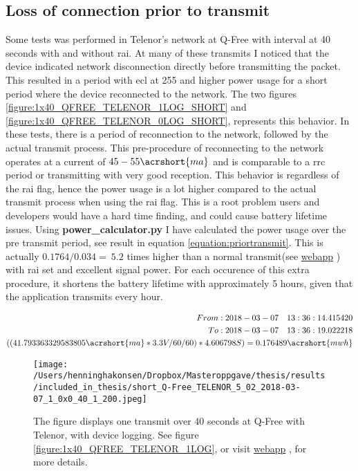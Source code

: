 \documentclass[USenglish]{ifimaster}  %
\begin{document}
\subsection{Loss of connection prior to transmit} \label{ssection:ecl_255}
Some tests was performed in Telenor's network at Q-Free with interval at 40 seconds with and without \acrshort{rai}. At many of these transmits I noticed that the device indicated network disconnection directly before transmitting the packet. This resulted in a period with \acrshort{ecl} at 255 and higher power usage for a short period where the device reconnected to the network. The two figures \vref{figure:1x40_QFREE_TELENOR_1LOG_SHORT} and \vref{figure:1x40_QFREE_TELENOR_0LOG_SHORT}, represents this behavior. In these tests, there is a period of reconnection to the network, followed by the actual transmit process. This pre-procedure of reconnecting to the network operates at a current of ${45-55 \acrshort{ma}}$ and is comparable to a \acrshort{rrc} period or transmitting with very good reception.
This behavior is regardless of the \acrshort{rai} flag, hence the power usage is a lot higher compared to the actual transmit process when using the \acrshort{rai} flag. This is a root problem users and developers would have a hard time finding, and could cause battery lifetime issues. Using \textbf{power\_calculator.py} I have calculated the power usage over the pre transmit period, see result in equation \vref{equation:priortransmit}. This is actually ${0.1764 / 0.034 = ~5.2}$ times higher than a normal transmit(see \href{http://158.39.77.97:9000/\#/results/Q-Free_TELENOR_SHORT_TEST_2018-02-28_0_0x2_5_1_100}{webapp} \cite{online:result11}) with \acrshort{rai} set and excellent signal power. For each occurence of this extra procedure, it shortens the battery lifetime with approximately 5 hours, given that the application transmits every hour.

\begin{equation} \label{equation:priortransmit}
\begin{aligned}
From: 2018-03-07\quad 13:36:14.415420 \\
To: 2018-03-07\quad 13:36:19.022218 \\
((41.793363329583805\acrshort{ma} * 3.3V / 60 / 60 ) * 4.606798S) = 0.176489\acrshort{mwh} \\
\end{aligned}
\end{equation}

\begin{figure}[H]
  \centering
  \texttt{[image: /Users/henninghakonsen/Dropbox/Masteroppgave/thesis/results/included\_in\_thesis/short\_Q-Free\_TELENOR\_5\_02\_2018-03-07\_1\_0x0\_40\_1\_200.jpeg]}
  \caption[Short-term test - loss of connection, with device logging]{The figure displays one transmit over 40 seconds at Q-Free with Telenor, with device logging. See figure \vref{figure:1x40_QFREE_TELENOR_1LOG}, or visit \href{http://158.39.77.97:9000/\#/results/Q-Free\_TELENOR\_5.02\_2018-03-07\_1\_0x0\_40\_1\_200}{webapp} \cite{online:result4}, for more details.}
  \label{figure:1x40_QFREE_TELENOR_1LOG_SHORT}
\end{figure}
\end{document}
